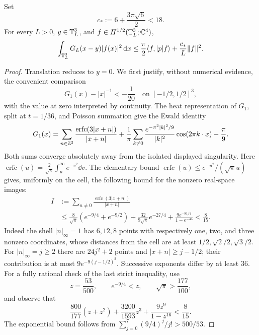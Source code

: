 \begin{lemma}
\label{lem:pkato}
Set
\[
 c_*:=6+\frac{3\pi\sqrt6}{2}<18.
\]
For every $L>0$, $y\in\mathbb T_L^3$, and
$f\in H^{1/2}(\mathbb T_L^3;\mathbb C^4)$,
\begin{equation}
 \int_{\mathbb T_L^3}G_L(x-y)|f(x)|^2\,\mathrm d x
 \le\frac\pi2\langle f,|p|f\rangle
       +\frac{c_*}{L}\|f\|^2.
 \label{eq:pkato}
\end{equation}
\end{lemma}
\begin{proof}
Translation reduces to $y=0$.  We first justify, without numerical evidence,
the convenient comparison
\begin{equation}
 G_1(x)-|x|^{-1}<-\frac1{20}
 \quad\text{on }[-1/2,1/2]^3,
 \label{eq:ewald-certified}
\end{equation}
with the value at zero interpreted by continuity.  The heat representation
of $G_1$, split at $t=1/36$, and Poisson summation give the Ewald identity
\begin{equation}
 G_1(x)=\sum_{n\in\mathbb Z^3}\frac{\operatorname{erfc}(3|x+n|)}{|x+n|}
 +\frac1\pi\sum_{k\ne0}
      \frac{e^{-\pi^2|k|^2/9}}{|k|^2}\cos(2\pi k\cdot x)
 -\frac\pi9.
 \label{eq:ewald-audit}
\end{equation}
Both sums converge absolutely away from the isolated displayed singularity.
Here $\operatorname{erfc}(u)=\frac2{\sqrt\pi}\int_u^\infty e^{-v^2}\dd v$.
The elementary bound
$\operatorname{erfc}(u)\le e^{-u^2}/(\sqrt\pi u)$ gives, uniformly on the
cell, the following bound for the nonzero real-space images:
\begin{align}
 I&:=\sum_{n\ne0}\frac{\operatorname{erfc}(3|x+n|)}{|x+n|}\nonumber\\
 &\le\frac8{\sqrt\pi}(e^{-9/4}+e^{-9/2})
       +\frac{32}{9\sqrt\pi}e^{-27/4}
       +\frac{9e^{-81/4}}{1-e^{-36}}
 <\frac8{15}.
 \label{eq:ewald-real-bound}
\end{align}
Indeed the shell $|n|_\infty=1$ has $6,12,8$ points with respectively one,
two, and three nonzero coordinates, whose distances from the cell are at
least $1/2,\sqrt2/2,\sqrt3/2$.  For $|n|_\infty=j\ge2$ there are
$24j^2+2$ points and $|x+n|\ge j-1/2$; their contribution is at most
$9e^{-9(j-1/2)^2}$.  Successive exponents differ by at least $36$.
For a fully rational check of the last strict inequality, use
\[
 z=\frac{53}{500},\qquad e^{-9/4}<z,\qquad\sqrt\pi>\frac{177}{100},
\]
and observe that
\[
 \frac{800}{177}(z+z^2)+\frac{3200}{1593}z^3
       +\frac{9z^9}{1-z^{16}}<\frac8{15}.
\]
The exponential bound follows from
$\sum_{j=0}^7(9/4)^j/j!>500/53$.


\end{proof}
